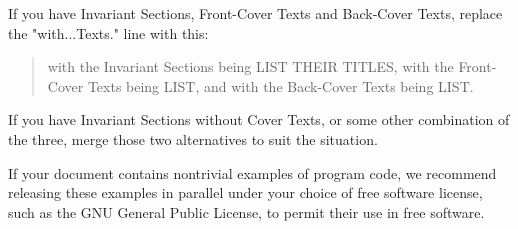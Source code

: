 \documentclass{report}
\begin{document}
If you have Invariant Sections, Front-Cover Texts and Back-Cover Texts,
replace the "with...Texts." line with this:

\bigskip
\begin{quote}
    with the Invariant Sections being LIST THEIR TITLES, with the
    Front-Cover Texts being LIST, and with the Back-Cover Texts being LIST.
\end{quote}
\bigskip
    
If you have Invariant Sections without Cover Texts, or some other
combination of the three, merge those two alternatives to suit the
situation.

If your document contains nontrivial examples of program code, we
recommend releasing these examples in parallel under your choice of
free software license, such as the GNU General Public License,
to permit their use in free software.
\end{document}
